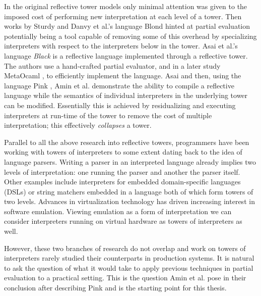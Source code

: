 \documentclass[a4paper,12pt,twoside,openright]{report}
\theoremstyle{definition}
\begin{document}
In the original reflective tower models only minimal attention was given to the imposed cost of performing new interpretation at each level of a tower. Then works by Sturdy \cite{sturdy1993lisp} and Danvy et al.'s language Blond \cite{danvy1988intensions} hinted at partial evaluation potentially being a tool capable of removing some of this overhead by specializing interpreters with respect to the interpreters below in the tower. Asai et al.'s language \textit{Black} \cite{asai1996duplication} is a reflective language implemented through a reflective tower. The authors use a hand-crafted partial evaluator, and in a later study MetaOcaml \cite{asai2015compiling}, to efficiently implement the language. Asai and then, using the language Pink \cite{amin2017collapsing}, Amin et al. demonstrate the ability to compile a reflective language while the semantics of individual interpreters in the underlying tower can be modified. Essentially this is achieved by residualizing and executing interpreters at run-time of the tower to remove the cost of multiple interpretation; this effectively \textit{collapses} a tower.

Parallel to all the above research into reflective towers, programmers have been working with towers of interpreters to some extent dating back to the idea of language parsers. Writing a parser in an interpreted language already implies two levels of interpretation: one running the parser and another the parser itself. Other examples include interpreters for embedded domain-specific languages (DSLs) or string matchers embedded in a language both of which form towers of two levels. Advances in virtualization technology has driven increasing interest in software emulation. Viewing emulation as a form of interpretation we can consider interpreters running on virtual hardware as towers of interpreters as well.

However, these two branches of research do not overlap and work on towers of interpreters rarely studied their counterparts in production systems. It is natural to ask the question of what it would take to apply previous techniques in partial evaluation to a practical setting. This is the question Amin et al. pose in their conclusion after describing Pink \cite{amin2017collapsing} and is the starting point for this thesis.
\end{document}
